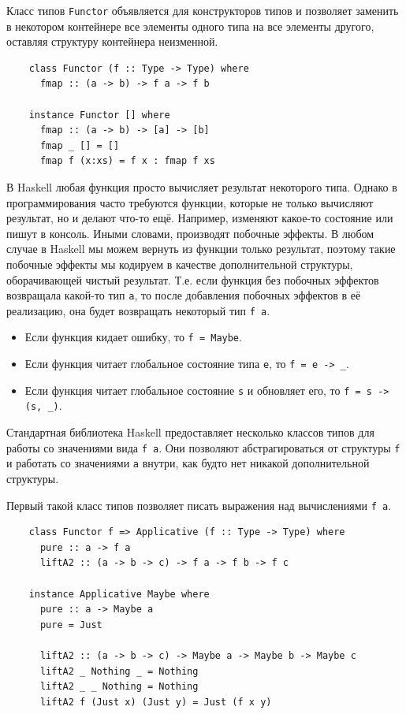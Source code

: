 Класс типов \texttt{Functor} объявляется для конструкторов типов и позволяет заменить в некотором контейнере все элементы одного типа на все элементы другого, оставляя структуру контейнера неизменной.

\begin{verbatim}
    class Functor (f :: Type -> Type) where
      fmap :: (a -> b) -> f a -> f b

    instance Functor [] where
      fmap :: (a -> b) -> [a] -> [b]
      fmap _ [] = []
      fmap f (x:xs) = f x : fmap f xs
\end{verbatim}

В Haskell любая функция просто вычисляет результат некоторого типа.
Однако в программирования часто требуются функции, которые не только вычисляют результат, но и делают что-то ещё.
Например, изменяют какое-то состояние или пишут в консоль.
Иными словами, производят побочные эффекты.
В любом случае в Haskell мы можем вернуть из функции только результат, поэтому такие побочные эффекты мы кодируем в качестве дополнительной структуры, оборачивающей чистый результат.
Т.е. если функция без побочных эффектов возвращала какой-то тип \texttt{a}, то после добавления побочных эффектов в её реализацию, она будет возвращать некоторый тип  \texttt{f a}.

\begin{itemize}
    \item Если функция кидает ошибку, то \texttt{f = Maybe}.
    \item Если функция читает глобальное состояние типа \texttt{e}, то \texttt{f = e -> \_}.
    \item Если функция читает глобальное состояние \texttt{s} и обновляет его, то \texttt{f = s -> (s, \_)}.
\end{itemize}

Стандартная библиотека Haskell предоставляет несколько классов типов для работы со значениями вида \texttt{f a}.
Они позволяют абстрагироваться от структуры \texttt{f} и работать со значениями \texttt{a} внутри, как будто нет никакой дополнительной структуры.

Первый такой класс типов позволяет писать выражения над вычислениями \texttt{f a}.
\begin{verbatim}
    class Functor f => Applicative (f :: Type -> Type) where
      pure :: a -> f a
      liftA2 :: (a -> b -> c) -> f a -> f b -> f c

    instance Applicative Maybe where
      pure :: a -> Maybe a
      pure = Just

      liftA2 :: (a -> b -> c) -> Maybe a -> Maybe b -> Maybe c
      liftA2 _ Nothing _ = Nothing
      liftA2 _ _ Nothing = Nothing
      liftA2 f (Just x) (Just y) = Just (f x y)
\end{verbatim}

